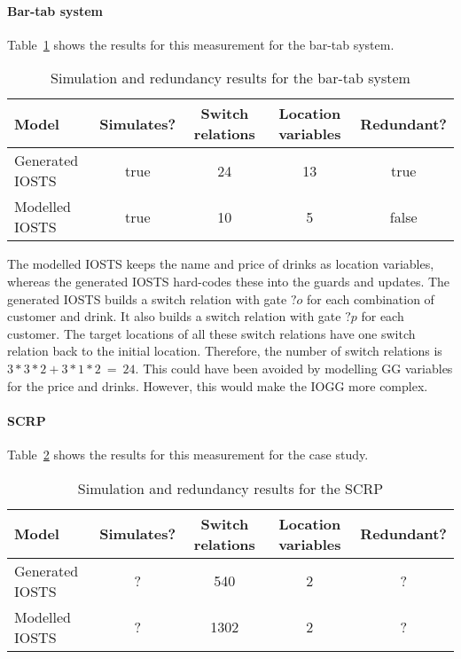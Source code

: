 \paragraph*{Bar-tab system}
Table~\ref{tab:bar-tab-simulate} shows the results for this measurement for the bar-tab system. 

\begin{table}[ht]
\begin{tabular}{|l|c|c|c|c|}
\hline
\textbf{Model} & \textbf{Simulates?} & \textbf{Switch relations} & \textbf{Location variables} & \textbf{Redundant?} \\ \hline
Generated IOSTS & true & 24 & 13 & true \\ \hline
Modelled IOSTS & true & 10 & 5 & false \\ \hline
\end{tabular}
\caption{Simulation and redundancy results for the bar-tab system}
\label{tab:bar-tab-simulate}
\end{table}

The modelled IOSTS keeps the name and price of drinks as location variables, whereas the generated IOSTS hard-codes these into the guards and updates. The generated IOSTS builds a switch relation with gate $?o$ for each combination of customer and drink. It also builds a switch relation with gate $?p$ for each customer. The target locations of all these switch relations have one switch relation back to the initial location. Therefore, the number of switch relations is $3*3*2+3*1*2\: =\: 24$. This could have been avoided by modelling GG variables for the price and drinks. However, this would make the IOGG more complex. 

\paragraph*{SCRP}
Table~\ref{tab:scrp-simulate} shows the results for this measurement for the case study.

\begin{table}[ht]
\begin{center}
\begin{tabular}{|l|c|c|c|c|}
\hline
\textbf{Model} & \textbf{Simulates?} & \textbf{Switch relations} & \textbf{Location variables} & \textbf{Redundant?} \\ \hline
Generated IOSTS & ? & 540 & 2 & ? \\ \hline
Modelled IOSTS & ? & 1302 & 2 & ? \\ \hline
\end{tabular}
\end{center}
\caption{Simulation and redundancy results for the SCRP}
\label{tab:scrp-simulate}
\end{table}

